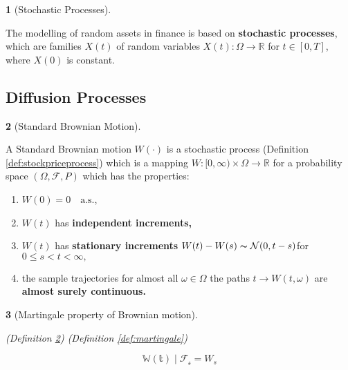 \documentclass[british]{amsart}
\numberwithin{equation}{section}
\numberwithin{figure}{section}
\theoremstyle{plain}
\newtheorem{thm}{\protect\theoremname}[section]
\theoremstyle{definition}
\newtheorem{defn}[thm]{\protect\definitionname}
\theoremstyle{plain}
\theoremstyle{plain}
\theoremstyle{plain}
\theoremstyle{remark}
\theoremstyle{plain}
\providecommand{\definitionname}{Definition}
\providecommand{\theoremname}{Theorem}
\newcommand{\filtration}[1]{\mathcal{F_{#1}}}
\newcommand{\almostsurely}{\text{a.s.}}
\newcommand{\E}[1]{\mathbb{#1}}
\begin{document}
\begin{defn} [Stochastic Processes]
	\label{def:stochasticprocesses}

	The modelling of random assets in finance is based on \textbf{stochastic
	processes}, which are families $X(t)$  of random variables $X(t):\Omega\to\mathbb{R}$
	for $t\in[0,T]$, where $X(0)$ is constant.

\end{defn}

\subsection{Diffusion Processes}


\begin{defn} [Standard Brownian Motion]
	\label{def:brownianmotion}

	A Standard Brownian motion $W(\cdot)$ is a stochastic process 
	(Definition \ref{def:stockpriceprocess})  which is a 	mapping 
	$W:[0,\infty)\times\Omega\to\mathbb{R}$ for a probability	space 
	$(\Omega,\mathcal{F},P)$ which has the properties: 

	\begin{enumerate}
		\item $W(0)=0 \quad \almostsurely$,
		\item $W(t)$ has \textbf{independent increments,}
		\item $W(t)$ has \textbf{stationary increments} 
			$W(t)-W(s)\thicksim\mathcal{N}(0,t-s)$for $0\le s<t<\infty,$
		\item the sample trajectories for almost all $\omega\in\Omega$ the paths 
			$t\to W(t,\omega)$ are \textbf{almost surely continuous.}
	\end{enumerate}

\end{defn}

\begin{thm} [Martingale property of Brownian motion]
	\label{tmh:brownianmotionmartingaleproperty}

	(Definition \ref{def:brownianmotion})
	(Definition \ref{def:martingale})

	\begin{equation*}
		\E{W(t) \mid \filtration{s}} = W_{s}
	\end{equation*}

\end{thm}
\end{document}
